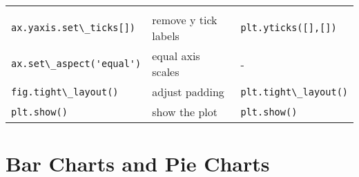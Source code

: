 \documentclass{book}
\newcommand{\passthrough}[1]{#1}
\begin{document}
\begin{longtable}[]{@{}lll@{}}
\begin{minipage}[t]{0.30\columnwidth}
\end{minipage}\tabularnewline
\begin{minipage}[t]{0.30\columnwidth}\raggedright
\passthrough{\lstinline!ax.yaxis.set\_ticks[])!}\strut
\end{minipage} & \begin{minipage}[t]{0.30\columnwidth}\raggedright
remove y tick labels\strut
\end{minipage} & \begin{minipage}[t]{0.30\columnwidth}\raggedright
\passthrough{\lstinline!plt.yticks([],[])!}\strut
\end{minipage}\tabularnewline
\begin{minipage}[t]{0.30\columnwidth}\raggedright
\passthrough{\lstinline!ax.set\_aspect('equal')!}\strut
\end{minipage} & \begin{minipage}[t]{0.30\columnwidth}\raggedright
equal axis scales\strut
\end{minipage} & \begin{minipage}[t]{0.30\columnwidth}\raggedright
-\strut
\end{minipage}\tabularnewline
\begin{minipage}[t]{0.30\columnwidth}\raggedright
\passthrough{\lstinline!fig.tight\_layout()!}\strut
\end{minipage} & \begin{minipage}[t]{0.30\columnwidth}\raggedright
adjust padding\strut
\end{minipage} & \begin{minipage}[t]{0.30\columnwidth}\raggedright
\passthrough{\lstinline!plt.tight\_layout()!}\strut
\end{minipage}\tabularnewline
\begin{minipage}[t]{0.30\columnwidth}\raggedright
\passthrough{\lstinline!plt.show()!}\strut
\end{minipage} & \begin{minipage}[t]{0.30\columnwidth}\raggedright
show the plot\strut
\end{minipage} & \begin{minipage}[t]{0.30\columnwidth}\raggedright
\passthrough{\lstinline!plt.show()!}\strut
\end{minipage}\tabularnewline
\bottomrule
\end{longtable}
    




    
        \hypertarget{bar-charts-and-pie-charts}{%
\section{Bar Charts and Pie Charts}\label{bar-charts-and-pie-charts}}
    
\end{document}
